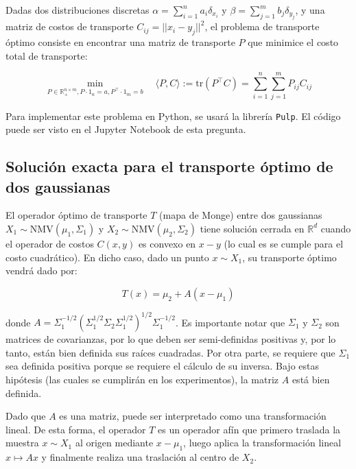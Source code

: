 \documentclass{article}
\begin{document}
Dadas dos distribuciones discretas $\alpha=\sum_{i=1}^n a_i\delta_{x_i}$ y $\beta=\sum_{j=1}^m b_j\delta_{y_j}$, y una matriz de costos de transporte $C_{ij} = ||x_i - y_j||^2$, el problema de transporte óptimo consiste en encontrar una matriz de transporte $P$ que minimice el costo total de transporte:

\begin{equation*}
\min_{P\in\mathbb{R}_+^{n\times m}, P\cdot 1_n = a, P^\top \cdot 1_m = b} \quad \langle P, C\rangle := \text{tr}(P^\top C) = \sum_{i=1}^n \sum_{j=1}^m P_{ij} C_{ij}
\end{equation*}

Para implementar este problema en Python, se usará la librería \texttt{Pulp}. El código puede ser visto en el Jupyter Notebook de esta pregunta.

\subsection{Solución exacta para el transporte óptimo de dos gaussianas}

El operador óptimo de transporte $T$ (mapa de Monge) entre dos gaussianas $X_1 \sim \text{NMV}(\mu_1, \Sigma_1)$ y $X_2 \sim\text{NMV}(\mu_2, \Sigma_2)$ tiene solución cerrada en $\mathbb{R}^d$ cuando el operador de costos $C(x, y)$ es convexo en $x-y$ (lo cual es se cumple para el costo cuadrático). En dicho caso, dado un punto $x\sim X_1$, su transporte óptimo vendrá dado por:

\begin{equation*}
	T(x) = \mu_2 + A(x - \mu_1)
\end{equation*}

donde $A = \Sigma_1^{-1/2}\left(\Sigma_1^{1/2} \Sigma_2 \Sigma_1^{1/2}\right)^{1/2}\Sigma_1^{-1/2}$. Es importante notar que $\Sigma_1$ y $\Sigma_2$ son matrices de covarianzas, por lo que deben ser semi-definidas positivas y, por lo tanto, están bien definida sus raíces cuadradas. Por otra parte, se requiere que $\Sigma_1$ sea definida positiva porque se requiere el cálculo de su inversa. Bajo estas hipótesis (las cuales se cumplirán en los experimentos), la matriz $A$ está bien definida.

Dado que $A$ es una matriz, puede ser interpretado como una transformación lineal. De esta forma, el operador $T$ es un operador afín que primero traslada la muestra $x\sim X_1$ al origen mediante $x-\mu_1$, luego aplica la transformación lineal $x\mapsto Ax$ y finalmente realiza una traslación al centro de $X_2$.
\end{document}
